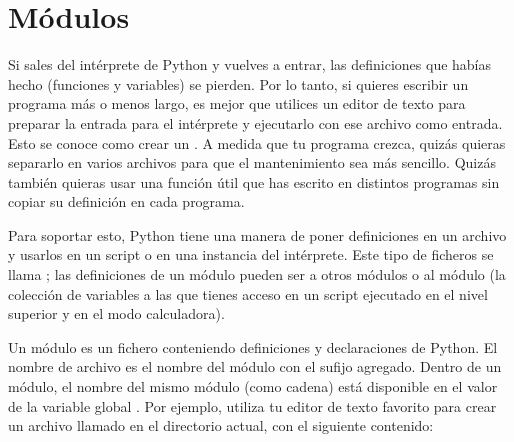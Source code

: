 \documentclass[a4,10pt,spanish]{sphinxmanual}
\begin{document}
\chapter{Módulos}
\label{\detokenize{tutorial/modules:modules}}\label{\detokenize{tutorial/modules:tut-modules}}\label{\detokenize{tutorial/modules::doc}}
\sphinxAtStartPar
Si sales del intérprete de Python y vuelves a entrar, las definiciones que habías hecho (funciones y variables) se pierden. Por lo tanto, si quieres escribir un programa más o menos largo, es mejor que utilices un editor de texto para preparar la entrada para el intérprete y ejecutarlo con ese archivo como entrada. Esto se conoce como crear un . A medida que tu programa crezca, quizás quieras separarlo en varios archivos para que el mantenimiento sea más sencillo. Quizás también quieras usar una función útil que has escrito en distintos programas sin copiar su definición en cada programa.

\sphinxAtStartPar
Para soportar esto, Python tiene una manera de poner definiciones en un archivo y usarlos en un script o en una instancia del intérprete. Este tipo de ficheros se llama ; las definiciones de un módulo pueden ser  a otros módulos o al módulo  (la colección de variables a las que tienes acceso en un script ejecutado en el nivel superior y en el modo calculadora).

\sphinxAtStartPar
Un módulo es un fichero conteniendo definiciones y declaraciones de Python. El nombre de archivo es el nombre del módulo con el sufijo  agregado. Dentro de un módulo, el nombre del mismo módulo (como cadena) está disponible en el valor de la variable global . Por ejemplo, utiliza tu editor de texto favorito para crear un archivo llamado  en el directorio actual, con el siguiente contenido:
\end{document}
